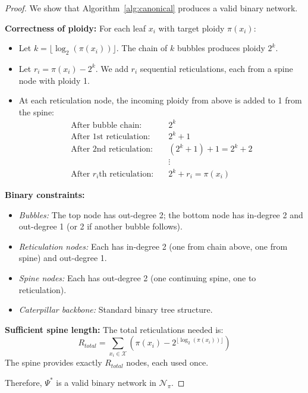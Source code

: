 \documentclass{article}
\begin{document}
\begin{proof}
We show that Algorithm~\ref{alg:canonical} produces a valid binary network.

\textbf{Correctness of ploidy:} For each leaf $x_i$ with target ploidy $\pi(x_i)$:
\begin{itemize}
    \item Let $k = \lfloor \log_2(\pi(x_i)) \rfloor$. The chain of $k$ bubbles produces ploidy $2^k$.
    
    \item Let $r_i = \pi(x_i) - 2^k$. We add $r_i$ sequential reticulations, each from a spine node with ploidy 1.
    
    \item At each reticulation node, the incoming ploidy from above is added to 1 from the spine:
    \begin{align*}
        \text{After bubble chain:} \quad & 2^k \\
        \text{After 1st reticulation:} \quad & 2^k + 1 \\
        \text{After 2nd reticulation:} \quad & (2^k + 1) + 1 = 2^k + 2 \\
        & \vdots \\
        \text{After $r_i$th reticulation:} \quad & 2^k + r_i = \pi(x_i)
    \end{align*}
\end{itemize}

\textbf{Binary constraints:} 
\begin{itemize}
    \item \textit{Bubbles:} The top node has out-degree 2; the bottom node has in-degree 2 and out-degree 1 (or 2 if another bubble follows).
    
    \item \textit{Reticulation nodes:} Each has in-degree 2 (one from chain above, one from spine) and out-degree 1.
    
    \item \textit{Spine nodes:} Each has out-degree 2 (one continuing spine, one to reticulation).
    
    \item \textit{Caterpillar backbone:} Standard binary tree structure.
\end{itemize}

\textbf{Sufficient spine length:} The total reticulations needed is:
\[R_{total} = \sum_{x_i \in \mathcal{X}} \left( \pi(x_i) - 2^{\lfloor \log_2(\pi(x_i)) \rfloor} \right)\]
The spine provides exactly $R_{total}$ nodes, each used once.

Therefore, $\Psi^*$ is a valid binary network in $\mathcal{N}_\pi$.
\end{proof}
\end{document}
